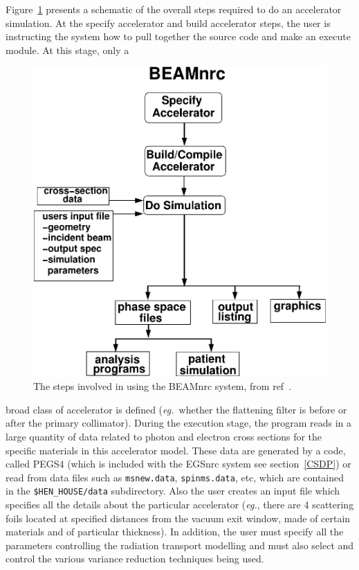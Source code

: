 \documentclass[12pt,twoside]{article}
\newcommand{\eg}{{\em eg.}}
\begin{document}
Figure~\ref{fig_flow} presents a schematic of the overall steps required
to do an accelerator simulation.  At the {\sf specify} accelerator and {\sf
build} accelerator steps, the user is instructing the system how to pull
together the source code and make an execute module.  At this stage, only a
 
\begin{figure}[htbp]
\begin{center}
\leavevmode
\mbox{}\hspace{0cm}
\includegraphics[width=12cm]{figures/flow}
\caption[Steps involved in using the BEAMnrc code]
{The steps involved in using the BEAMnrc system, from ref~\cite{Ro95}.}
\label{fig_flow}
\end{center}
\end{figure}
broad class of accelerator is defined (\eg\ whether the flattening
filter is before or after the primary collimator).  During the execution
stage, the program reads in a large quantity of data related to photon
and electron cross sections for the specific materials in this
accelerator model. These data are generated by a code,
called PEGS4 (which is included with the EGSnrc system
see section~\ref{CSDP}) or read from data files such as
{\tt msnew.data}, {\tt spinms.data}, etc,  which are contained in the
{\tt \$HEN\_HOUSE/data} subdirectory. Also the user creates an input file
which specifies
all the details about the particular accelerator (\eg, there are 4 scattering
foils located at specified distances from the vacuum exit window,
made of certain materials and of particular thickness).  In addition, the user
must specify all the parameters controlling the radiation transport
modelling and must also select and control the various variance
reduction techniques being used.
\end{document}

